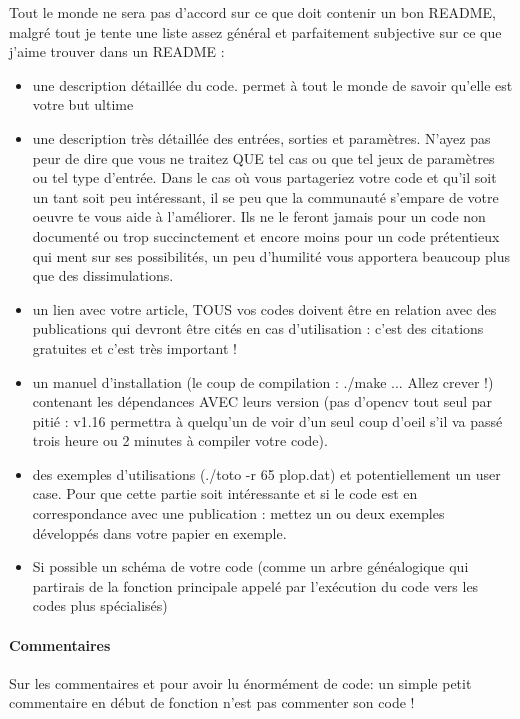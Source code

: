 Tout le monde ne sera pas d'accord sur ce que doit contenir un bon README, malgré tout je tente une
 liste assez général et parfaitement subjective sur ce que j'aime trouver dans un README : 
\begin{itemize}
\item une description détaillée du code. permet à tout le monde de savoir qu'elle est votre but ultime
\item une description très détaillée des entrées, sorties et paramètres. N'ayez pas peur de dire que
 vous ne traitez QUE tel cas ou que tel jeux de paramètres ou tel type d'entrée. Dans le cas où vous 
partageriez votre code et qu'il soit un tant soit peu intéressant, il se peu que la communauté s'empare 
de votre oeuvre te vous aide à l'améliorer. Ils ne le feront jamais pour un code non documenté ou trop
 succinctement et encore moins pour un code prétentieux qui ment sur ses possibilités, un peu d'humilité 
vous apportera beaucoup plus que des dissimulations.
\item un lien avec votre article, TOUS vos codes doivent être en relation avec des publications qui 
devront être cités en cas d'utilisation : c'est des citations gratuites et c'est très important ! 
\item un manuel d'installation (le coup de compilation : ./make ... Allez crever !) contenant les 
dépendances AVEC leurs version (pas d'opencv tout seul par pitié : v1.16 permettra à quelqu'un de 
voir d'un seul coup d'oeil s'il va passé trois heure ou 2 minutes à compiler votre code).
\item des exemples d'utilisations (./toto -r 65 plop.dat) et potentiellement un user case. Pour que
 cette partie soit intéressante et si le code est en correspondance avec une publication : mettez 
un ou deux exemples développés dans votre papier en exemple.
\item Si possible un schéma de votre code (comme un arbre généalogique qui partirais de la fonction
 principale appelé par l'exécution du code vers les codes plus spécialisés)
\end{itemize}

\paragraph{Commentaires}

Sur les commentaires et pour avoir lu énormément de code: un simple petit commentaire en début de 
fonction n'est pas commenter son code ! \\

